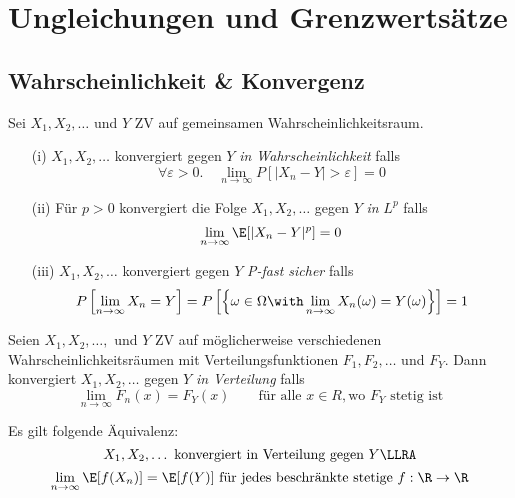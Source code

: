 \pagebreak
\section{Ungleichungen und Grenzwertsätze}
\subsection{Wahrscheinlichkeit \& Konvergenz}
\begin{definition}
Sei $X_1,X_2,\dots$ und $Y$ ZV auf gemeinsamen Wahrscheinlichkeitsraum.
\begin{itemize}
	\item[(i)] $X_1,X_2,\dots$ konvergiert gegen $Y$ \textit{in Wahrscheinlichkeit} falls $$\forall
		\varepsilon >0. \quad \lim_{n\to \infty} P[ |X_n -Y| > \varepsilon] = 0$$
	\item[(ii)] Für $p>0$ konvergiert die Folge $X_1,X_2,\dots$ gegen $Y$ \textit{in} $L^p$ falls
		$$\lim_{n\to\infty} \E[ |X_n - Y|^p] = 0$$
	\item[(iii)] $X_1,X_2,\dots$ konvergiert gegen $Y$ \textit{P-fast sicher} falls $$ P\left[
		\lim_{n\to\infty} X_n = Y \right] = P \left[ \left \{ \omega \in \Omega \with
		\lim_{n\to\infty} X_n(\omega) = Y(\omega) \right \} \right] = 1$$
\end{itemize}
\end{definition}

\begin{definition}
Seien $X_1,X_2,\dots,$ und $Y$ ZV auf möglicherweise verschiedenen Wahrscheinlichkeitsräumen mit Verteilungsfunktionen $F_1,F_2,\dots$ und $F_Y$. Dann konvergiert $X_1,X_2, \dots$ gegen $Y$ \textit{in Verteilung} falls
$$ \lim_{n\to\infty} F_n(x) = F_Y(x) \quad \quad \mbox{für alle } x\in R, \mbox{wo } F_Y \mbox{ stetig ist}$$
\end{definition}

\begin{satz}
Es gilt folgende Äquivalenz:
$$ X_1,X_2,\dots \mbox{ konvergiert in Verteilung gegen } Y\LLRA$$ $$ \lim_{n\to\infty} \E[f(X_n)] = \E[f(Y)] \mbox{ für jedes beschränkte stetige } f:\R\to\R$$
\end{satz}

